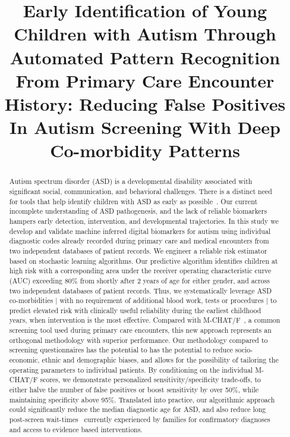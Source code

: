 \documentclass[onecolumn,,10pt]{IEEEtran}
\title{ \sffamily \fontsize{20}{24}\selectfont  
Early Identification of Young  Children with Autism Through Automated Pattern Recognition From Primary Care Encounter History: Reducing  False Positives In Autism Screening With Deep Co-morbidity Patterns%
}
\author{\sffamily  \fontsize{10}{12}\selectfont  Dmytro Onishchenko$^{1}$, Yi Huang$^{1}$,  James van Horne$^{1}$, Peter J. Smith$^{4,7}$, Michael M. Msall$^{5,6}$ and Ishanu Chattopadhyay$^{1,2,3\bigstar}$\\ 
\vspace{10pt}

\sffamily  \fontsize{10}{12}\selectfont
$^{1}$Department of Medicine,\\
$^{2}$Committee on Genetics, Genomics \& Systems Biology, \\
$^{3}$Committee on Quantitative Methods in Social, Behavioral, and Health Sciences, \\
$^{4}$Department of Pediatrics, Section of Developmental and Behavioral Pediatrics,\\
$^{5}$Department of Pediatrics, Section Chief of Developmental and Behavioral Pediatrics,\\
$^{6}$Joseph  P. Kennedy Research Center on Intellectual and Neurodevelopmental Disabilities\\ University of Chicago, Chicago, IL, USA\\
$^{7}$Executive Committee Chair, American Academy of Pediatrics’ Section on Developmental and Behavioral Pediatrics,\\
\vskip 1em
$^\bigstar$To whom correspondence should be addressed: e-mail:  \texttt{ishanu@uchicago.edu}.}
\begin{document}
\maketitle

\vspace{-15pt}

\begin{abstract}  \sffamily \fontsize{10}{12}\selectfont \noindent
 Autism spectrum disorder (ASD) is a developmental disability associated with  significant social, communication, and behavioral challenges. There is   a distinct need for tools that help identify children with ASD as early as possible~\cite{cdc0,nimh}.
Our current incomplete understanding of ASD pathogenesis, and the lack of reliable biomarkers hampers early detection,  intervention, and developmental trajectories. 
In this study we develop and validate  machine inferred digital biomarkers for autism using individual diagnostic codes already recorded during primary care and medical encounters from two independent databases of patient records. We engineer a reliable risk estimator based on stochastic learning algorithms. Our predictive algorithm identifies  children at high risk  with a corresponding area under the receiver operating characteristic curve (AUC)  exceeding 80\% from shortly after 2 years of age for either gender, and across two independent databases of patient records. Thus, we systematically leverage ASD co-morbidities | with no requirement of additional blood work, tests  or  procedures |  to predict  elevated  risk with clinically useful reliability during the earliest childhood years, when intervention is the  most effective.  Compared with  M-CHAT/F~\cite{pmid31562252}, a common screening tool  used  during primary care encounters, this new approach represents an orthogonal  methodology with  superior performance. Our methodology compared to screening questionnaires has the potential to %
has the potential to  reduce socio-economic, ethnic and demographic biases, and allows for the possibility of  tailoring  the operating parameters  to individual patients. By conditioning on the individual M-CHAT/F scores, we demonstrate personalized sensitivity/specificity trade-offs,  to either halve the number of  false positives or boost sensitivity by over 50\%, while maintaining  specificity  above 95\%. Translated into practice, our algorithmic approach could significantly reduce the median diagnostic age for ASD, and also reduce  long post-screen wait-times~\cite{pmid27565363} currently experienced by families for confirmatory diagnoses and access to  evidence based interventions.
  \end{abstract}
\end{document}
